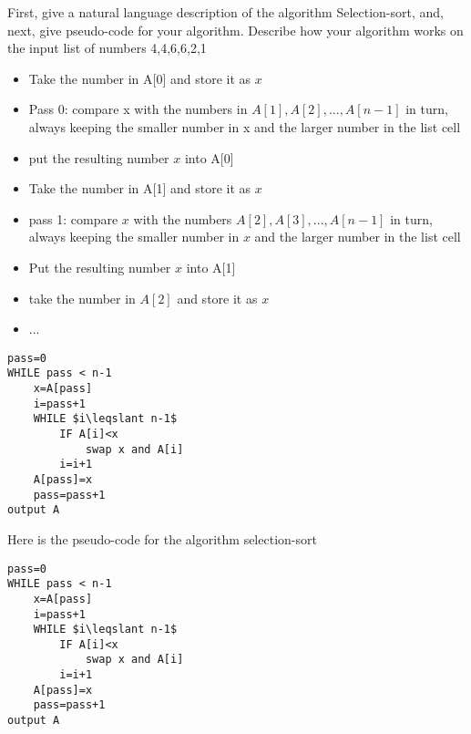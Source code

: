 \documentclass[addpoints]{exam}
\begin{document}
\begin{questions}
\newpage
\question[12]First, give a natural language description of the algorithm Selection-sort, and, next, give pseudo-code for your algorithm. Describe how your algorithm works on the input list of numbers 4,4,6,6,2,1
\begin{solution}[2in]
	\begin{itemize}
		\item Take the number in A[0] and store it as $x$
		\item Pass 0: compare x with the numbers in $A[1],A[2],...,A[n-1]$ in turn, always keeping the smaller number in x and the larger number in the list cell
		\item put the resulting number $x$ into A[0]
		\item Take the number in A[1] and store it as $x$
		\item pass 1: compare $x$ with the numbers $A[2],A[3],...,A[n-1]$ in turn, always keeping the smaller number in $x$ and the larger number in the list cell
		\item Put the resulting number $x$ into A[1]
		\item take the number in $A[2]$ and store it as $x$
		\item ...
	\end{itemize}
	\begin{lstlisting}
pass=0
WHILE pass < n-1
	x=A[pass]
	i=pass+1
	WHILE $i\leqslant n-1$
		IF A[i]<x
			swap x and A[i]
		i=i+1
	A[pass]=x
	pass=pass+1
output A
	\end{lstlisting}
\end{solution}
\newpage
\question Here is the pseudo-code for the algorithm selection-sort
\begin{lstlisting}
pass=0
WHILE pass < n-1
	x=A[pass]
	i=pass+1
	WHILE $i\leqslant n-1$
		IF A[i]<x
			swap x and A[i]
		i=i+1
	A[pass]=x
	pass=pass+1
output A
\end{lstlisting}
\end{questions}
\end{document}
